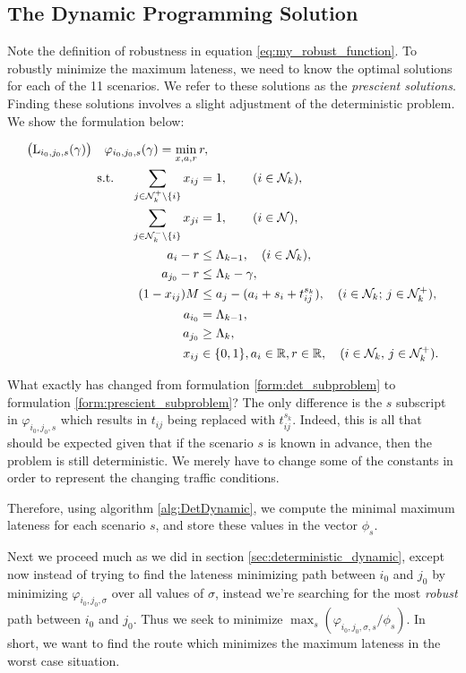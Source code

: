 \subsection{The Dynamic Programming Solution}
Note the definition of robustness in equation \ref{eq:my_robust_function}. To robustly minimize the maximum lateness, we need to know the optimal solutions for each of the 11 scenarios. We refer to these solutions as the \textit{prescient solutions}. Finding these solutions involves a slight adjustment of the deterministic problem. We show the formulation below:

\begin{align}
\label{form:prescient_subproblem}
\begin{split}
\bigl(\operatorname{L}_{i_0,j_0, s}(\gamma)\bigr)\quad
\varphi_{i_0,j_0, s}(\gamma)=\min_{x,a,r}\,&r,\\
\text{s.t. }\quad \sum_{j\in{\mathcal N}_{k}^+\setminus\{i\}} x_{ij}&=1,\qquad (i\in{\mathcal N}_k),\\
\sum_{j\in{\mathcal N}_{k}^-\setminus\{i\}} x_{ji}&=1,\qquad(i\in{\mathcal N}),\\
a_i-r&\leq \Lambda_{k-1},\quad(i\in{\mathcal N}_k),\\
a_{j_0} -r& \leq \Lambda_k - \gamma, \\
(1-x_{ij})M&\leq a_j - (a_i+s_i+t^{s_k}_{ij}),\quad(i\in{\mathcal N}_k;\,j\in{\mathcal N}_k^+),\\
a_{i_0}&=\Lambda_{k-1},\\
a_{j_0}&\geq \Lambda_{k},\\
x_{ij}&\in\{0,1\},  a_i\in\mathbb{R}, r\in\mathbb{R},\quad(i\in{\mathcal N}_k,\,j\in{\mathcal N}_k^+).
\end{split}
\end{align}

What exactly has changed from formulation \ref{form:det_subproblem} to formulation \ref{form:prescient_subproblem}? The only difference is the $s$ subscript in $\varphi_{i_0, j_0, s}$ which results in $t_{ij}$ being replaced with $t^{s_k}_{ij}$. Indeed, this is all that should be expected given that if the scenario $s$ is known in advance, then the problem is still deterministic. We merely have to change some of the constants in order to represent the changing traffic conditions.

Therefore, using algorithm \ref{alg:DetDynamic}, we compute the minimal maximum lateness for each scenario $s$, and store these values in the vector $\phi_s$. 

Next we proceed much as we did in section \ref{sec:deterministic_dynamic}, except now instead of trying to find the lateness minimizing path between $i_0$ and $j_0$ by minimizing $\varphi_{i_0, j_0, \sigma}$ over all values of $\sigma$, instead we're searching for the most \textit{robust} path between $i_0$ and $j_0$. Thus we seek to minimize $\max_s (\varphi_{i_0, j_0, \sigma, s}/\phi_s)$. In short, we want to find the route which minimizes the maximum lateness in the worst case situation. 

